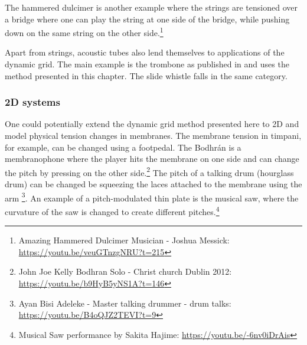The hammered dulcimer is another example where the strings are tensioned over a bridge where one can play the string at one side of the bridge, while pushing down on the same string on the other side.\footnote{Amazing Hammered Dulcimer Musician - Joshua Messick: \url{https://youtu.be/veuGTnzgNRU?t=215}}

Apart from strings, acoustic tubes also lend themselves to applications of the dynamic grid. The main example is the trombone as published in \citeP[H] and uses the method presented in this chapter. The slide whistle falls in the same category. 

\subsubsection{2D systems}
One could potentially extend the dynamic grid method presented here to 2D and model physical tension changes in membranes. The membrane tension in timpani, for example, can be changed using a footpedal. The Bodhr\'an is a membranophone where the player hits the membrane on one side and can change the pitch by pressing on the other side.\footnote{John Joe Kelly Bodhran Solo - Christ church Dublin 2012: \url{https://youtu.be/b9HyB5yNS1A?t=146}} The pitch of a talking drum (hourglass drum) can be changed be squeezing the laces attached to the membrane using the arm \footnote{Ayan Bisi Adeleke - Master talking drummer - drum talks: \url{https://youtu.be/B4oQJZ2TEVI?t=9}}. An example of a pitch-modulated thin plate is the musical saw, where the curvature of the saw is changed to create different pitches.\footnote{Musical Saw performance by Sakita Hajime: \url{https://youtu.be/-6nv0iDrAis}}







